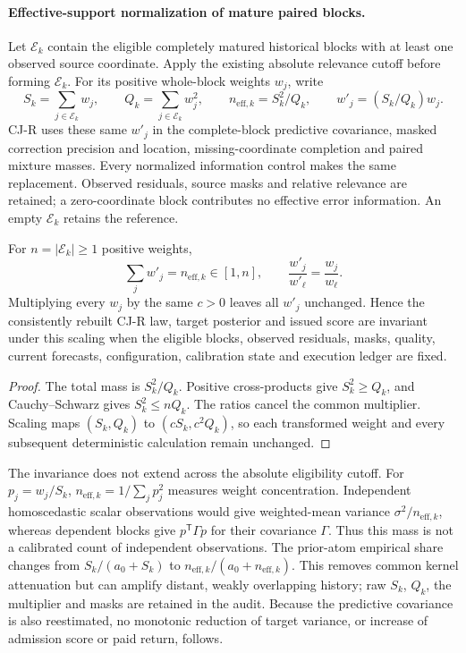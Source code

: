 \paragraph{Effective-support normalization of mature paired blocks.}
Let $\mathcal E_k$ contain the eligible completely matured historical blocks
with at least one observed source coordinate.  Apply the existing absolute
relevance cutoff before forming $\mathcal E_k$.  For its positive whole-block
weights $w_j$, write
\begin{equation}
 S_k=\sum_{j\in\mathcal E_k}w_j,\qquad
 Q_k=\sum_{j\in\mathcal E_k}w_j^2,\qquad
 n_{\mathrm{eff},k}=S_k^2/Q_k,\qquad
 w'_j=(S_k/Q_k)w_j.
 \label{cjr_effective_support_normalization}
\end{equation}
CJ-R uses these same $w'_j$ in the complete-block predictive covariance,
masked correction precision and location, missing-coordinate completion and
paired mixture masses.  Every normalized information control makes the same
replacement.  Observed residuals, source masks and relative relevance are
retained; a zero-coordinate block contributes no effective error information.
An empty $\mathcal E_k$ retains the reference.

\begin{proposition}
\label{cjr_fixed_support_scale_invariance}
For $n=|\mathcal E_k|\geq1$ positive weights,
\begin{equation}
 \sum_jw'_j=n_{\mathrm{eff},k}\in[1,n],\qquad
 \frac{w'_j}{w'_\ell}=\frac{w_j}{w_\ell}.
 \label{cjr_normalized_mass_and_ratios}
\end{equation}
Multiplying every $w_j$ by the same $c>0$ leaves all $w'_j$ unchanged.
Hence the consistently rebuilt CJ-R law, target posterior and issued score
are invariant under this scaling when the eligible blocks, observed residuals,
masks, quality, current forecasts, configuration, calibration state and
execution ledger are fixed.
\end{proposition}
\begin{proof}
The total mass is $S_k^2/Q_k$.  Positive cross-products give $S_k^2\geq Q_k$,
and Cauchy--Schwarz gives $S_k^2\leq nQ_k$.  The ratios cancel the common
multiplier.  Scaling maps $(S_k,Q_k)$ to $(cS_k,c^2Q_k)$, so each transformed
weight and every subsequent deterministic calculation remain unchanged.
\end{proof}
The invariance does not extend across the absolute eligibility cutoff.
For $p_j=w_j/S_k$, $n_{\mathrm{eff},k}=1/\sum_jp_j^2$ measures weight
concentration.  Independent homoscedastic scalar observations would give
weighted-mean variance $\sigma^2/n_{\mathrm{eff},k}$, whereas dependent blocks
give $p^{\mathsf T}\Gamma p$ for their covariance $\Gamma$.
Thus this mass is not a calibrated count of independent observations.
The prior-atom empirical share changes from $S_k/(a_0+S_k)$ to
$n_{\mathrm{eff},k}/(a_0+n_{\mathrm{eff},k})$.  This removes common kernel
attenuation but can amplify distant, weakly overlapping history; raw $S_k$,
$Q_k$, the multiplier and masks are retained in the audit.
Because the predictive covariance is also reestimated, no monotonic reduction
of target variance, or increase of admission score or paid return, follows.

